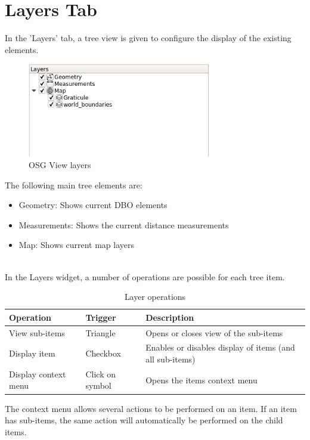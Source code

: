 \section{Layers Tab}

In the 'Layers' tab, a tree view is given to configure the display of the existing elements. 

\begin{figure}[H]
    \includegraphics[width=8cm,frame]{../screenshots/osgview_layers.png}
  \caption{OSG View layers}
\end{figure}

The following main tree elements are:\\

\begin{itemize}
 \item Geometry: Shows current DBO elements
 \item Measurements: Shows the current distance measurements
 \item Map: Shows current map layers
\end{itemize} 
 \ \\

In the Layers widget, a number of operations are possible for each tree item.

\begin{table}[H]
  \center
  \begin{tabular}{ | l | l | l |}
    \hline
    \textbf{Operation} & \textbf{Trigger} &  \textbf{Description} \\ \hline
    View sub-items & Triangle & Opens or closes view of the sub-items \\ \hline
    Display item & Checkbox & Enables or disables display of items (and all sub-items) \\ \hline
    Display context menu & Click on symbol & Opens the items context menu \\ \hline
  \end{tabular}
  \caption{Layer operations}
\end{table}

The context menu allows several actions to be performed on an item. If an item has sub-items, the same action will automatically be performed on the child items.






